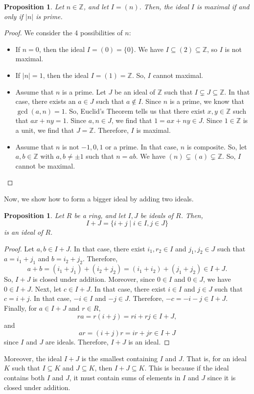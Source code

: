 \documentclass[a4paper, openany]{memoir}
\theoremstyle{definition}
\theoremstyle{plain}
\newtheorem{proposition}[definition]{Proposition}
\begin{document}
\begin{proposition}
Let $n \in \mathbb{Z}$, and let $I = (n)$. Then, the ideal $I$ is maximal if and only if $|n|$ is prime.
\end{proposition}
\begin{proof}
We consider the 4 possibilities of $n$:
\begin{itemize}
    \item If $n = 0$, then the ideal $I = (0) = \{0\}$. We have $I \subseteq (2) \subseteq \mathbb{Z}$, so $I$ is not maximal.
    
    \item If $|n| = 1$, then the ideal $I = (1) = \mathbb{Z}$. So, $I$ cannot maximal.
    
    \item Assume that $n$ is a prime. Let $J$ be an ideal of $\mathbb{Z}$ such that $I \subsetneq J \subseteq \mathbb{Z}$. In that case, there exists an $a \in J$ such that $a \not\in I$. Since $n$ is a prime, we know that $\gcd(a, n) = 1$. So, Euclid's Theorem tells us that there exist $x, y \in \mathbb{Z}$ such that $ax + ny = 1$. Since $a, n \in J$, we find that $1 = ax + ny \in J$. Since $1 \in \mathbb{Z}$ is a unit, we find that $J = \mathbb{Z}$. Therefore, $I$ is maximal.
    
    \item Assume that $n$ is not $-1, 0, 1$ or a prime. In that case, $n$ is composite. So, let $a, b \in \mathbb{Z}$ with $a, b \neq \pm 1$ such that $n = ab$. We have $(n) \subsetneq (a) \subsetneq \mathbb{Z}$. So, $I$ cannot be maximal.
\end{itemize}
\end{proof}
\noindent Now, we show how to form a bigger ideal by adding two ideals.
\begin{proposition}
Let $R$ be a ring, and let $I, J$ be ideals of $R$. Then,
\[I + J = \{i + j \mid i \in I, j \in J\}\]
is an ideal of $R$. 
\end{proposition}
\begin{proof}
Let $a, b \in I + J$. In that case, there exist $i_1, r_2 \in I$ and $j_1, j_2 \in J$ such that $a = i_1 + j_1$ and $b = i_2 + j_2$. Therefore,
\[a + b = (i_1 + j_1) + (i_2 + j_2) = (i_1 + i_2) + (j_1 + j_2) \in I + J.\]
So, $I + J$ is closed under addition. Moreover, since $0 \in I$ and $0 \in J$, we have $0 \in I + J$. Next, let $c \in I + J$. In that case, there exist $i \in I$ and $j \in J$ such that $c = i + j$. In that case, $-i \in I$ and $-j \in J$. Therefore, $-c = -i - j \in I + J$. Finally, for $a \in I + J$ and $r \in R$,
\[ra = r(i + j) = ri + rj \in I + J,\]
and
\[ar = (i + j)r = ir + jr \in I + J\]
since $I$ and $J$ are ideals. Therefore, $I + J$ is an ideal.
\end{proof}
\noindent Moreover, the ideal $I+J$ is the smallest containing $I$ and $J$. That is, for an ideal $K$ such that $I \subseteq K$ and $J \subseteq K$, then $I+J \subseteq K$. This is because if the ideal contains both $I$ and $J$, it must contain sums of elements in $I$ and $J$ since it is closed under addition.
\end{document}
